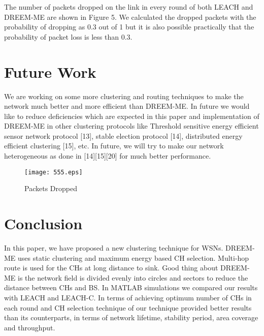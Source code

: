 \documentclass[journal]{IEEEtran}
\begin{document}
The number of packets dropped on the link in every round of both LEACH and DREEM-ME are shown in Figure 5. We calculated the dropped packets with the probability of dropping as 0.3 out of 1 but it is also possible practically that the probability of packet loss is less than 0.3.

\section{Future Work}
We are working on some more clustering and routing techniques to make the network much better and more efficient than DREEM-ME. In future we would like to reduce deficiencies which are expected in this paper and implementation of DREEM-ME in other clustering protocols like Threshold sensitive energy efficient sensor network protocol [13], stable election protocol [14], distributed energy efficient clustering [15], etc. In future, we will try to make our network heterogeneous as done in [14][15][20] for much better performance.

\begin{figure}[!h]
\centering
\texttt{[image: 555.eps]}
\caption{ Packets Dropped }
\end{figure}

\section{Conclusion}
In this paper, we have proposed a new clustering technique for WSNs. DREEM-ME uses static clustering and maximum energy based CH selection. Multi-hop route is used for the CHs at long distance to sink. Good thing about DREEM-ME is the network field is divided evenly into circles and sectors to reduce the distance between CHs and BS. In MATLAB simulations we compared our results with LEACH and LEACH-C. In terms of achieving optimum number of CHs in each round and CH selection technique of our technique provided better results than its counterparts, in terms of network lifetime, stability period, area coverage and throughput.
\end{document}
